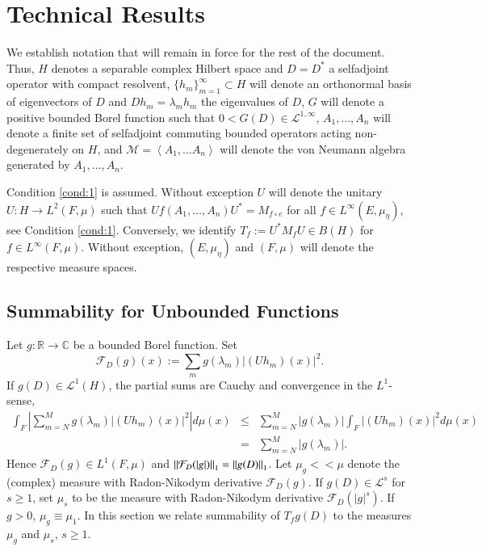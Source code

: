 \documentclass[final,1p]{elsarticle}
\numberwithin{equation}{section}
\theoremstyle{plain}
\theoremstyle{definition}
\begin{document}
\section{Technical Results} \label{sec:tech}

We establish notation that will remain in force for the rest of the document.  Thus,
$H$ denotes a separable complex Hilbert space and $D=D^*$ a selfadjoint operator with compact resolvent, $\{ h_m \}_{m=1}^\infty \subset H$ will denote an orthonormal basis
of eigenvectors of $D$ and $Dh_m = \lambda_mh_m$ the eigenvalues of $D$,
$G$ will denote a positive bounded Borel function such that $0 < G(D) \in \mathcal{L}^{1,\infty}$, $A_1,\ldots,A_n$ will denote a finite set of selfadjoint commuting bounded operators acting non-degenerately on $H$, and
$\mathcal{M}=\left< A_1,\ldots A_n \right>$ will denote the von Neumann algebra generated
by $A_1,\ldots,A_n$.

Condition \ref{cond:1} is assumed.
Without exception $U$ will denote the unitary $U : H \to L^2(F,\mu)$
such that $Uf(A_1,\ldots,A_n)U^* = M_{f \circ e}$ for all $f \in L^\infty(E,\mu_\eta)$, see Condition \ref{cond:1}.  Conversely, we
identify $T_f  := U^* M_f U \in B(H)$ for $f \in L^\infty(F,\mu)$.
Without exception, $(E,\mu_\eta)$ and $(F,\mu)$ will denote the respective measure spaces.

\subsection{Summability for Unbounded Functions} \label{sec:2.1}

\medskip Let $g : {\ensuremath{\mathbb{R}}} \to {\ensuremath{\mathbb{C}}}$ be a bounded Borel function. Set
\begin{equation} \label{eq:2.2}
\mathcal{F}_D(g)(x) := \sum_{m} g(\lambda_m) |(Uh_m)(x)|^2 .
\end{equation}
If $g(D) \in \mathcal{L}^1(H)$, the partial sums are Cauchy and convergence in the $L^1$-sense,
\begin{eqnarray*}
\int_{F} \left| \sum_{m=N}^M g(\lambda_m) |(Uh_m)(x)|^2 \right| d\mu(x)
& \leq & \sum_{m=N}^M |g(\lambda_m)| \int_F |(Uh_m)(x)|^2 d\mu(x) \\
& = & \sum_{m=N}^M |g(\lambda_m)| .
\end{eqnarray*}
Hence $\mathcal{F}_D(g) \in L^1(F,\mu)$ and ${\mbox{\ensuremath{\| {\mathcal{F}_D(|g|)} \|}}}_1 = {\mbox{\ensuremath{\| {g(D)} \|}}}_1$.
Let $\mu_g {\ensuremath{\! < \! \! < \!}} \mu$ denote the (complex)
measure with Radon-Nikodym derivative $\mathcal{F}_D(g)$.
If $g(D) \in \mathcal{L}^s$ for $s \geq 1$, set $\mu_{s}$ to be the measure
with Radon-Nikodym derivative $\mathcal{F}_D(|g|^s)$.
If $g > 0$, $\mu_g \equiv \mu_1$.
In this section we relate summability of $T_fg(D)$ to the measures $\mu_g$ and $\mu_s$, $s \geq 1$.
\end{document}
